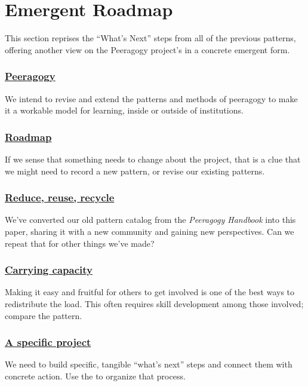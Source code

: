 \section{Emergent Roadmap} \label{sec:Distributed_Roadmap}

This section reprises the ``What's Next'' steps from all of the previous
patterns, offering another view on the Peeragogy project's
 in a concrete emergent form.

\subsubsection*{\hyperref[sec:Peeragogy]{Peeragogy}} 
 We intend to revise and extend the patterns and methods of peeragogy to make it a workable model for learning, inside or outside of institutions.

\subsubsection*{\hyperref[sec:Roadmap]{Roadmap}} 
If we sense that something needs to change about the project, that is a clue that we might need to record a new pattern, or revise our existing patterns.

\subsubsection*{\hyperref[sec:Reduce, reuse, recycle]{Reduce, reuse, recycle}}
We've converted our old pattern catalog from the \emph{Peeragogy Handbook} into this paper, sharing it with a new community and gaining new perspectives.  Can we repeat that for other things we've made?

\subsubsection*{\hyperref[sec:Carrying capacity]{Carrying capacity}} 
Making it easy and fruitful for others to get involved is one of the best ways to redistribute the load.  This often requires skill development among those involved; compare the  pattern.

\subsubsection*{\hyperref[sec:A specific project]{A specific project}}
We need to build specific, tangible ``what's next'' steps and connect them with concrete action. Use the  to organize that process. 

